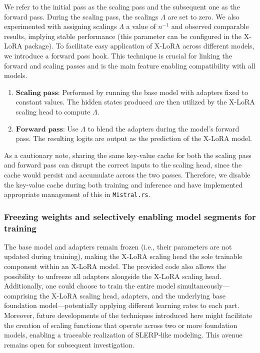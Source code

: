 We refer to the initial pass as the scaling pass and the subsequent one as the forward pass. During the scaling pass, the scalings $\Lambda$ are set to zero. We also experimented with assigning scalings $\Lambda$ a value of ${n}^{-1}$ and observed comparable results, implying stable performance (this parameter can be configured in the X-LoRA package). To facilitate easy application of X-LoRA across different models, we introduce a forward pass hook. This technique is crucial for linking the forward and scaling passes and is the main feature enabling compatibility with all models.

\begin{enumerate}
    \item $\mathbf{Scaling}$ $\mathbf{pass}$: Performed by running the base model with adapters fixed to constant values. The hidden states produced are then utilized by the X-LoRA scaling head to compute $\Lambda$.
    \item $\mathbf{Forward}$ $\mathbf{pass}$: Use $\Lambda$ to blend the adapters during the model’s forward pass. The resulting logits are output as the prediction of the X-LoRA model.
\end{enumerate}

As a cautionary note, sharing the same key-value cache for both the scaling pass and forward pass can disrupt the correct inputs to the scaling head, since the cache would persist and accumulate across the two passes. Therefore, we disable the key-value cache during both training and inference and have implemented appropriate management of this in \texttt{Mistral.rs}.

\subsubsection{Freezing weights and selectively enabling model segments for training} The base model and adapters remain frozen (i.e., their parameters are not updated during training), making the X-LoRA scaling head the sole trainable component within an X-LoRA model. The provided code also allows the possibility to unfreeze all adapters alongside the X-LoRA scaling head. Additionally, one could choose to train the entire model simultaneously—comprising the X-LoRA scaling head, adapters, and the underlying base foundation model—potentially applying different learning rates to each part. Moreover, future developments of the techniques introduced here might facilitate the creation of scaling functions that operate across two or more foundation models, enabling a traceable realization of SLERP-like modeling. This avenue remains open for subsequent investigation.

